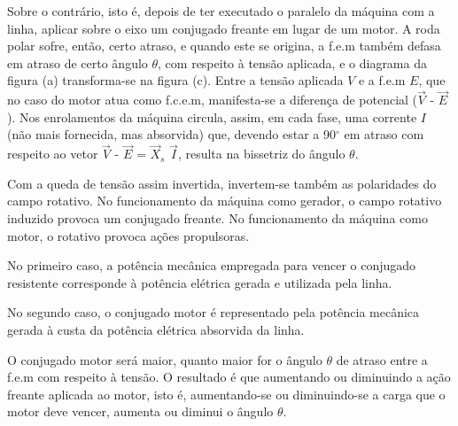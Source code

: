 Sobre o contrário, isto é, depois de ter executado o paralelo da máquina com a linha, aplicar sobre o eixo um conjugado freante em lugar de um motor. A roda polar sofre, então, certo atraso, e quando este se origina, a f.e.m também defasa em atraso de certo ângulo $\theta$, com respeito à tensão aplicada, e o diagrama da figura (a) transforma-se na figura (c). Entre a tensão aplicada $V$ e a f.e.m $E$, que no caso do motor atua como f.c.e.m, manifesta-se a diferença de potencial ($\vec V$ - $\vec E$). Nos enrolamentos da máquina circula, assim, em cada fase, uma corrente $I$ (não mais fornecida, mas absorvida) que, devendo estar a 90$^{\circ}$ em atraso com respeito ao vetor $\vec V$ - $\vec E$ = $\vec X_s$ $\vec I$, resulta na bissetriz do ângulo $\theta$.

Com a queda de tensão assim invertida, invertem-se também  as polaridades do campo rotativo. No funcionamento da máquina como gerador, o campo rotativo induzido provoca um conjugado freante. No funcionamento da máquina como motor, o rotativo provoca ações propulsoras.

No primeiro caso, a potência mecânica empregada para vencer o conjugado resistente corresponde à potência elétrica gerada e utilizada pela linha.

No segundo caso, o conjugado motor é representado pela potência mecânica gerada à custa da potência elétrica absorvida da linha.

O conjugado motor será maior, quanto maior for o ângulo $\theta$ de atraso entre a f.e.m com respeito à tensão. O resultado é que aumentando ou diminuindo a ação freante aplicada ao motor, isto é, aumentando-se ou diminuindo-se a carga que o motor deve vencer, aumenta ou diminui o ângulo $\theta$.

